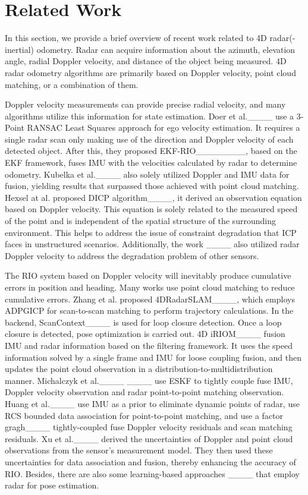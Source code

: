 \section{Related Work}
In this section, we provide a brief overview of recent work related to 4D radar(-inertial) odometry. Radar can acquire information about the azimuth, elevation angle, radial Doppler velocity, and distance of the object being measured.
 4D radar odometry algorithms are primarily based on Doppler velocity, point cloud matching, or a combination of them.

Doppler velocity measurements can provide precise radial velocity, and many algorithms utilize this information for state estimation. Doer et al.____ use a 3-Point RANSAC Least Squares approach for ego velocity estimation. It requires a single radar scan only making use of the direction and Doppler velocity of each detected object. After this, they proposed EKF-RIO________, based on the EKF framework, fuses IMU with the velocities calculated by radar to determine odometry. Kubelka et al.____ also solely utilized Doppler and IMU data for fusion, yielding results that surpassed those achieved with point cloud matching. Hexsel at al. proposed DICP algorithm____, it derived an observation equation based on Doppler velocity. This equation is solely related to the measured speed of the point and is independent of the spatial structure of the surrounding environment. This helps to address the issue of constraint degradation that ICP faces in unstructured scenarios.
Additionally, the work ____ also utilized radar Doppler velocity to address the degradation problem of other sensors.

The RIO system based on Doppler velocity will inevitably produce cumulative errors in position and heading. Many works use point cloud matching to reduce cumulative errors. Zhang et al. proposed 4DRadarSLAM____, which employs ADPGICP for scan-to-scan matching to perform trajectory calculations. In the backend, ScanContext____ is used for loop closure detection. Once a loop closure is detected, pose optimization is carried out.
4D iRIOM____ fusion IMU and radar information based on the filtering framework. It uses the speed information solved by a single frame and IMU for loose coupling fusion, and then updates the point cloud observation in a distribution-to-multidistribution manner. Michalczyk et al.____ ____ use ESKF to tightly couple fuse IMU, Doppler velocity observation and radar point-to-point matching observation. Huang et al.____ use IMU as a prior to eliminate dynamic points of radar, use RCS bounded data association for point-to-point matching, and use a factor gragh____ tightly-coupled  fuse  Doppler velocity residuals and scan matching residuals. Xu et al.____ derived the uncertainties of Doppler and point cloud observations from the sensor's measurement model. They then used these uncertainties for data association and fusion, thereby enhancing the accuracy of RIO.
Besides, there are also some learning-based approaches ____ that employ radar for pose estimation.

